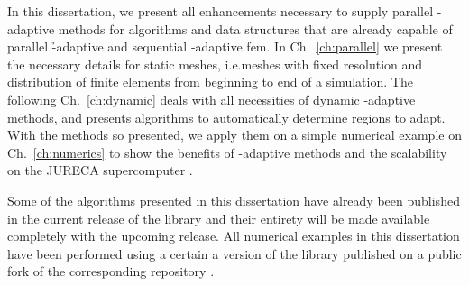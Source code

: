 

In this dissertation, we present all enhancements necessary to supply parallel \hp-adaptive methods for algorithms and data structures that are already capable of parallel \h-adaptive and sequential \hp-adaptive \gls{fem}. In Ch.~\ref{ch:parallel} we present the necessary details for static meshes, i.e.\@ meshes with fixed resolution and distribution of finite elements from beginning to end of a simulation. The following Ch.~\ref{ch:dynamic} deals with all necessities of dynamic \hp-adaptive methods, and presents algorithms to automatically determine regions to adapt. With the methods so presented, we apply them on a simple numerical example on Ch.~\ref{ch:numerics} to show the benefits of \hp-adaptive methods and the scalability on the JURECA supercomputer \parencite{krause2016}.

Some of the algorithms presented in this dissertation have already been published in the current release of the \dealii{} library \parencite{arndt2019,dealii920pre} and their entirety will be made available completely with the upcoming release. All numerical examples in this dissertation have been performed using a certain a version of the library published on a public fork \textcite{finaldissertation} of the corresponding \dealii{} repository \textcite{dealii920pre}.
